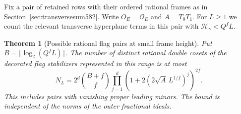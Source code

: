 \documentclass[a4paper,11pt]{article}
\newtheorem{theorem}[proposition]{Theorem}
\theoremstyle{definition}
\theoremstyle{remark}
\numberwithin{equation}{section}
\begin{document}
Fix a pair of retained rows with their ordered rational frames
as in Section~\ref{sec:transversesum582}. Write \(O_E=\mathcal O_E\)
and \(A=T_0T_1\). For \(L\ge1\) we count the relevant transverse
hyperplane terms in this pair with \(\mathcal H_\gamma<Q^fL\).

\begin{theorem}[Possible rational flag pairs at small frame height]
\leavevmode\label{thm:smallframes590}
Put \(B=\lfloor\log_2(Q^fL)\rfloor\). The number of distinct
rational double cosets of the decorated flag stabilizers
represented in this range is at most
\[
   N_L=2^d\binom{B+f}{f}
        \prod_{j=1}^d
          \left(1+2(2\sqrt A\,L^{1/f})^j\right)^{2f}.
\]
This includes pairs with vanishing proper leading minors.
The bound is independent of the norms of the outer fractional
ideals.
\end{theorem}
\end{document}

